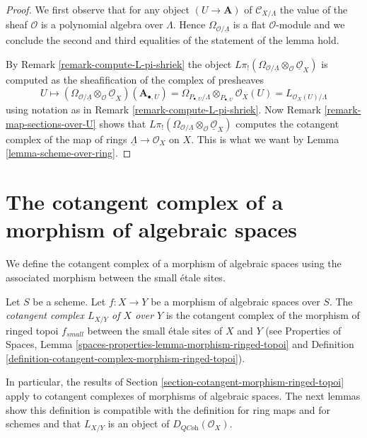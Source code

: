 \begin{proof}
We first observe that for any object $(U \to \mathbf{A})$ of
$\mathcal{C}_{X/\Lambda}$
the value of the sheaf $\mathcal{O}$ is a polynomial algebra over $\Lambda$.
Hence $\Omega_{\mathcal{O}/\underline{\Lambda}}$ is a flat $\mathcal{O}$-module
and we conclude the second and third equalities of the statement of the
lemma hold.

\medskip\noindent
By Remark \ref{remark-compute-L-pi-shriek} the object
$L\pi_!(\Omega_{\mathcal{O}/\underline{\Lambda}}
\otimes_\mathcal{O} \underline{\mathcal{O}}_X)$
is computed as the sheafification of the complex of presheaves
$$
U \mapsto
\left(\Omega_{\mathcal{O}/\underline{\Lambda}}
\otimes_\mathcal{O} \underline{\mathcal{O}}_X\right)(\mathbf{A}_{\bullet, U})
=
\Omega_{P_{\bullet, U}/\Lambda} \otimes_{P_{\bullet, U}} \mathcal{O}_X(U) =
L_{\mathcal{O}_X(U)/\Lambda}
$$
using notation as in Remark \ref{remark-compute-L-pi-shriek}.
Now Remark \ref{remark-map-sections-over-U} shows that
$L\pi_!(\Omega_{\mathcal{O}/\underline{\Lambda}}
\otimes_\mathcal{O} \underline{\mathcal{O}}_X)$
computes the cotangent complex of the map of rings
$\underline{\Lambda} \to \mathcal{O}_X$ on $X$.
This is what we want by Lemma \ref{lemma-scheme-over-ring}.
\end{proof}








\section{The cotangent complex of a morphism of algebraic spaces}
\label{section-cotangent-morphism-spaces}

\noindent
We define the cotangent complex of a morphism of algebraic spaces
using the associated morphism between the small \'etale sites.

\begin{definition}
\label{definition-cotangent-morphism-spaces}
Let $S$ be a scheme. Let $f : X \to Y$ be a morphism of algebraic spaces
over $S$. The {\it cotangent complex $L_{X/Y}$ of $X$ over $Y$} is the
cotangent complex of the morphism of ringed topoi $f_{small}$
between the small \'etale sites of $X$ and $Y$
(see
Properties of Spaces, Lemma
\ref{spaces-properties-lemma-morphism-ringed-topoi}
and
Definition \ref{definition-cotangent-complex-morphism-ringed-topoi}).
\end{definition}

\noindent
In particular, the results of
Section \ref{section-cotangent-morphism-ringed-topoi} apply
to cotangent complexes of morphisms of algebraic spaces.
The next lemmas show this definition is compatible with the definition
for ring maps and for schemes and that $L_{X/Y}$ is an
object of $D_{\textit{QCoh}}(\mathcal{O}_X)$.

